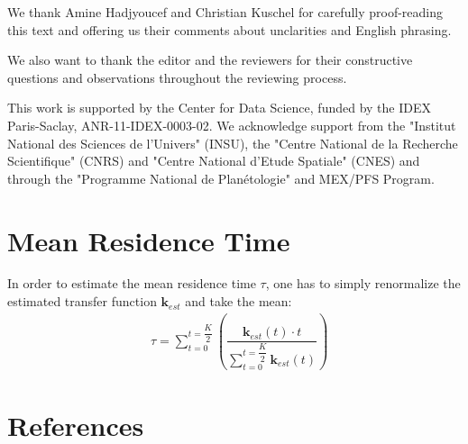 \documentclass[]{elsarticle} %
\begin{document}
We thank Amine Hadjyoucef and Christian Kuschel for carefully proof-reading this text and offering us their comments about unclarities and English phrasing.

We also want to thank the editor and the reviewers for their constructive questions and observations throughout the reviewing process.

This work is supported by the Center for Data Science, funded by the IDEX Paris-Saclay, ANR-11-IDEX-0003-02. We acknowledge support from the "Institut National des Sciences de l'Univers" (INSU), the "Centre National de la Recherche Scientifique" (CNRS) and "Centre National d'Etude Spatiale" (CNES) and through the "Programme National de Planétologie" and MEX/PFS Program.


\appendix

\section{Mean Residence Time}
\label{app:B}

In order to estimate the mean residence time $\tau$, one has to simply renormalize the estimated transfer function $\textbf{k}_{est}$ and take the mean:
\begin{equation}\label{21}
\begin{aligned}
& \tau = \displaystyle\sum_{t=0}^{t = \dfrac{K}{2}} \left( \dfrac{\textbf{k}_{est}(t) \cdot t }{\displaystyle\sum_{t=0}^{t = \dfrac{K}{2}} \textbf{k}_{est}(t)} \right)
\end{aligned}
\end{equation}

\section*{References}


\end{document}
